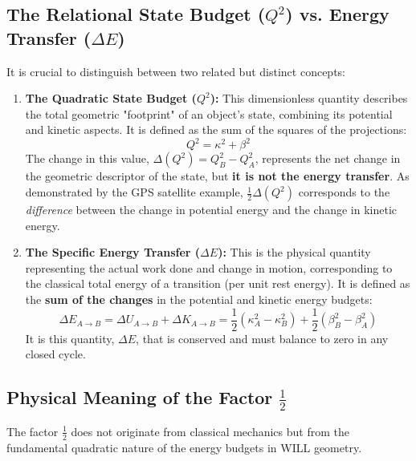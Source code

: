 \documentclass[12pt, a4paper]{article}
\begin{document}
\subsection{The Relational State Budget ($Q^2$) vs. Energy Transfer ($\Delta E$)}

It is crucial to distinguish between two related but distinct concepts:

\begin{enumerate}
    \item \textbf{The Quadratic State Budget ($Q^2$):} This dimensionless quantity describes the total geometric "footprint" of an object's state, combining its potential and kinetic aspects. It is defined as the sum of the squares of the projections:
    \begin{equation}
    Q^2 = \kappa^2 + \beta^2
    \end{equation}
    The change in this value, $\Delta(Q^2) = Q_B^2 - Q_A^2$, represents the net change in the geometric descriptor of the state, but \textbf{it is not the energy transfer}. As demonstrated by the GPS satellite example, $\frac{1}{2}\Delta(Q^2)$ corresponds to the \textit{difference} between the change in potential energy and the change in kinetic energy.

    \item \textbf{The Specific Energy Transfer ($\Delta E$):} This is the physical quantity representing the actual work done and change in motion, corresponding to the classical total energy of a transition (per unit rest energy). It is defined as the \textbf{sum of the changes} in the potential and kinetic energy budgets:
    \begin{equation}
    \Delta E_{A \to B} = \Delta U_{A \to B} + \Delta K_{A \to B} = \frac{1}{2}\left(\kappa_A^2 - \kappa_B^2\right) + \frac{1}{2}\left(\beta_B^2 - \beta_A^2\right)
    \end{equation}
    It is this quantity, $\Delta E$, that is conserved and must balance to zero in any closed cycle.
\end{enumerate}

\subsection{Physical Meaning of the Factor $\frac{1}{2}$}

The factor $\frac{1}{2}$ does not originate from classical mechanics but from the fundamental quadratic nature of the energy budgets in WILL geometry.
\end{document}

